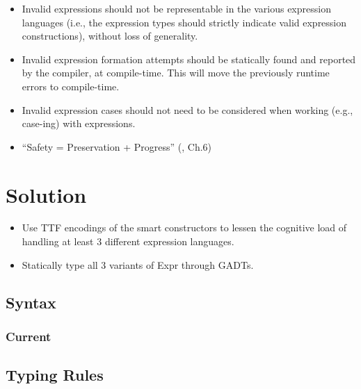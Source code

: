 \begin{itemize}

      \item Invalid expressions should not be representable in the various
            expression languages (i.e., the expression types should strictly
            indicate valid expression constructions), without loss of
            generality.

      \item Invalid expression formation attempts should be statically found and
            reported by the compiler, at compile-time. This will move the
            previously runtime errors to compile-time.

      \item Invalid expression cases should not need to be considered when
            working (e.g., case-ing) with expressions.

      \item ``Safety = Preservation + Progress'' (\cite{Harper2016}, Ch.6)

\end{itemize}

\section{Solution}

\begin{itemize}

      \item Use TTF encodings of the smart constructors to lessen the cognitive
            load of handling at least 3 different expression languages.

      \item Statically type all 3 variants of Expr through GADTs.

\end{itemize}

\subsection{Syntax}

\subsubsection{Current}



\subsection{Typing Rules}

